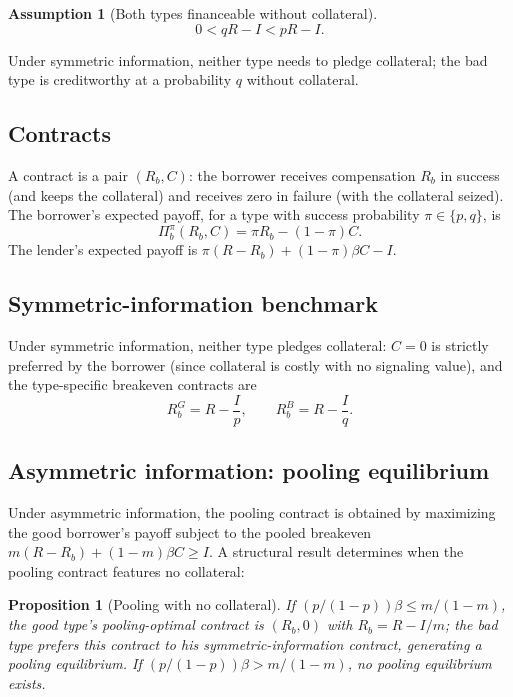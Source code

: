 \documentclass[11pt,a4paper,oneside]{book}
\def\leq{\leqslant}
\def\geq{\geqslant}
\theoremstyle{plain}
\newtheorem{proposition}[theorem]{Proposition}
\theoremstyle{definition}
\newtheorem{assumption}[theorem]{Assumption}
\theoremstyle{remark}
\numberwithin{equation}{chapter}
\begin{document}
\begin{assumption}[Both types financeable without collateral]\label{ass:diss-coll-viable}
\begin{equation*}
  0 < q R - I < p R - I.
\end{equation*}
\end{assumption}

Under symmetric information, neither type needs to pledge collateral; the bad type is creditworthy at a probability $q$ without collateral.

\subsection{Contracts}

A contract is a pair $(R_b, C)$: the borrower receives compensation $R_b$ in success (and keeps the collateral) and receives zero in failure (with the collateral seized).
The borrower's expected payoff, for a type with success probability $\pi \in \{p, q\}$, is
\begin{equation*}
  \Pi_b^\pi(R_b, C) = \pi R_b - (1 - \pi) C.
\end{equation*}
The lender's expected payoff is $\pi(R - R_b) + (1 - \pi) \beta C - I$.

\subsection{Symmetric-information benchmark}

Under symmetric information, neither type pledges collateral: $C = 0$ is strictly preferred by the borrower (since collateral is costly with no signaling value), and the type-specific breakeven contracts are
\begin{equation*}
  R_b^{G} = R - \frac{I}{p},
  \qquad
  R_b^{B} = R - \frac{I}{q}.
\end{equation*}

\subsection{Asymmetric information: pooling equilibrium}

Under asymmetric information, the pooling contract is obtained by maximizing the good borrower's payoff subject to the pooled breakeven $m(R - R_b) + (1 - m) \beta C \geq I$.
A structural result determines when the pooling contract features no collateral:

\begin{proposition}[Pooling with no collateral]\label{prop:diss-coll-pool-nocoll}
If $(p/(1-p)) \beta \leq m/(1-m)$, the good type's pooling-optimal contract is $(R_b, 0)$ with $R_b = R - I/m$; the bad type prefers this contract to his symmetric-information contract, generating a pooling equilibrium.
If $(p/(1-p)) \beta > m/(1-m)$, no pooling equilibrium exists.
\end{proposition}
\end{document}
